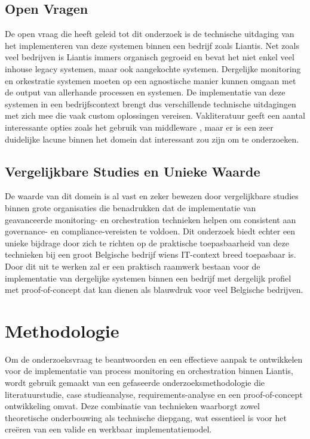 \subsection{Open Vragen}

De open vraag die heeft geleid tot dit onderzoek is de technische uitdaging van het implementeren van deze systemen binnen een bedrijf zoals Liantis. Net zoals veel bedrijven is Liantis immers organisch gegroeid en bevat het niet enkel veel inhouse legacy systemen, maar ook aangekochte systemen. Dergelijke monitoring en orkestratie systemen moeten op een agnostische manier kunnen omgaan met de output van allerhande processen en systemen. De implementatie van deze systemen in een bedrijfscontext brengt dus verschillende technische uitdagingen met zich mee die vaak custom oplossingen vereisen. Vakliteratuur geeft een aantal interessante opties zoals het gebruik van middleware \autocite{Weber2018}, maar er is een zeer duidelijke lacune binnen het domein dat interessant zou zijn om te onderzoeken. 

\subsection{Vergelijkbare Studies en Unieke Waarde}

De waarde van dit domein is al vast en zeker bewezen door vergelijkbare studies binnen grote organisaties \autocite{Harmon2014} die benadrukken dat de implementatie van geavanceerde monitoring- en orchestration technieken helpen om consistent aan governance- en compliance-vereisten te voldoen. Dit onderzoek biedt echter een unieke bijdrage door zich te richten op de praktische toepasbaarheid van deze technieken bij een groot Belgische bedrijf wiens IT-context breed toepasbaar is. Door dit uit te werken zal er een praktisch raamwerk bestaan voor de implementatie van dergelijke systemen binnen een bedrijf met dergelijk profiel met proof-of-concept dat kan dienen als blauwdruk voor veel Belgische bedrijven. 

\section{Methodologie}%
\label{sec:methodologie}

Om de onderzoeksvraag te beantwoorden en een effectieve aanpak te ontwikkelen voor de implementatie van process monitoring en orchestration binnen Liantis, wordt gebruik gemaakt van een gefaseerde onderzoeksmethodologie die literatuurstudie, case studieanalyse, requirements-analyse en een proof-of-concept ontwikkeling omvat. Deze combinatie van technieken waarborgt zowel theoretische onderbouwing als technische diepgang, wat essentieel is voor het creëren van een valide en werkbaar implementatiemodel.

